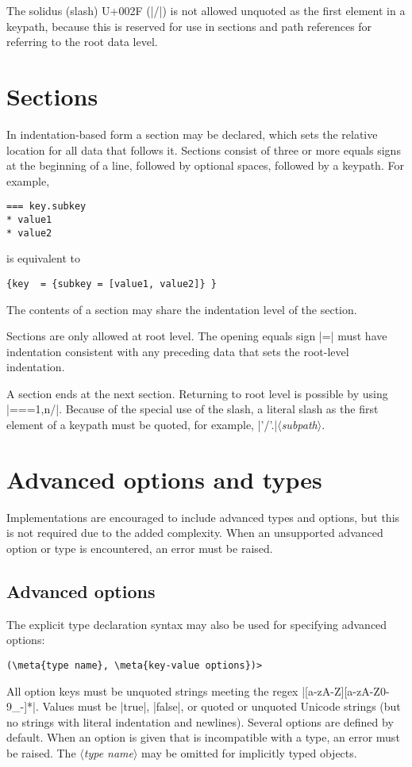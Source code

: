 \documentclass[11pt]{article}
\newcommand{\meta}[1]{\ensuremath{\langle}\textit{#1}\ensuremath{\rangle}}
\newcommand{\vmeta}[1]{{\color{DarkRed}\ensuremath{\langle}\textit{#1}\ensuremath{\rangle}}}
\begin{document}
{{The solidus (slash) U+002F (|/|) is not allowed unquoted as the first element in a keypath, because this is reserved for use in sections and path references for referring to the root data level.

\section{Sections}

In indentation-based form a section may be declared, which sets the relative location for all data that follows it.  Sections consist of three or more equals signs at the beginning of a line, followed by optional spaces, followed by a keypath.  For example,
\begin{Verbatim}
=== key.subkey
* value1
* value2
\end{Verbatim}
is equivalent to
\begin{Verbatim}
{key  = {subkey = [value1, value2]} }
\end{Verbatim}
The contents of a section may share the indentation level of the section.

Sections are only allowed at root level.  The opening equals sign |=| must have indentation consistent with any preceding data that sets the root-level indentation.

A section ends at the next section.  Returning to root level is possible by using |==={1,n}/|.  Because of the special use of the slash, a literal slash as the first element of a keypath must be quoted, for example, |{'/'}.|\vmeta{subpath}.



\section{Advanced options and types}
\label{sec:advanced-options}

Implementations are encouraged to include advanced types and options, but this is not required due to the added complexity.  When an unsupported advanced option or type is encountered, an error must be raised.

\subsection{Advanced options}

The explicit type declaration syntax may also be used for specifying advanced options:
\begin{Verbatim}[commandchars=\\\{\}]
(\meta{type name}, \meta{key-value options})>
\end{Verbatim}
All option keys must be unquoted strings meeting the regex |[a-zA-Z][a-zA-Z0-9_-]*|.  Values must be |true|, |false|, or quoted or unquoted Unicode strings (but no strings with literal indentation and newlines).  Several options are defined by default.  When an option is given that is incompatible with a type, an error must be raised.  The \vmeta{type name} may be omitted for implicitly typed objects.

}}
\end{document}
